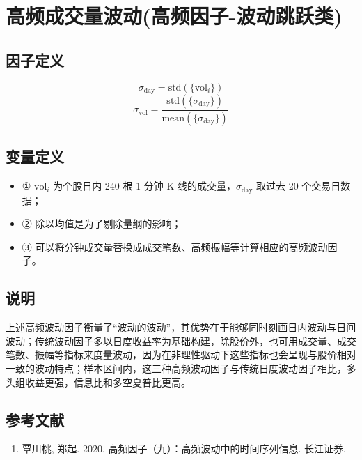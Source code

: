 \documentclass{article}
\begin{document}
\section{高频成交量波动(高频因子-波动跳跃类)}

\subsection{因子定义}
\begin{equation}
    \sigma_{\mathrm{day}} = \mathrm{std}(\{\mathrm{vol}_i\})
\end{equation}
\begin{equation}
    \sigma_{\mathrm{vol}} = \frac{\mathrm{std}(\{\sigma_{\mathrm{day}}\})}{\mathrm{mean}(\{\sigma_{\mathrm{day}}\})}
\end{equation}

\subsection{变量定义}
\begin{itemize}
    \item ① \( \mathrm{vol}_i \) 为个股日内 240 根 1 分钟 K 线的成交量，\( \sigma_{\mathrm{day}} \) 取过去 20 个交易日数据；
    \item ② 除以均值是为了剔除量纲的影响；
    \item ③ 可以将分钟成交量替换成成交笔数、高频振幅等计算相应的高频波动因子。
\end{itemize}

\subsection{说明}
上述高频波动因子衡量了“波动的波动”，其优势在于能够同时刻画日内波动与日间波动；传统波动因子多以日度收益率为基础构建，除股价外，也可用成交量、成交笔数、振幅等指标来度量波动，因为在非理性驱动下这些指标也会呈现与股价相对一致的波动特点；样本区间内，这三种高频波动因子与传统日度波动因子相比，多头组收益更强，信息比和多空夏普比更高。

\subsection{参考文献}
\begin{enumerate}
    \item 覃川桃, 郑起. 2020. 高频因子（九）：高频波动中的时间序列信息. 长江证券.
\end{enumerate}
\end{document}
